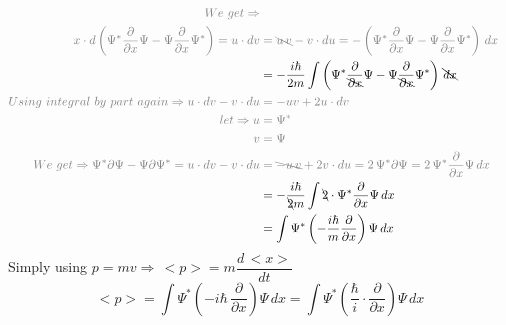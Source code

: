 \begin{align}
        \color{gray} We~get\Rightarrow\\
        \color{gray} x \cdot d \left( \Psi^*\dfrac{\partial}{\partial x}\Psi - \Psi \dfrac{\partial}{\partial x}\Psi^* \right)
        = u\cdot dv
        &\color{gray} = \bcancel{u\,v} - v\cdot du
        = - \left( \Psi^*\dfrac{\partial}{\partial x}\Psi - \Psi \dfrac{\partial}{\partial x}\Psi^* \right)\,dx\\
        & =  -\dfrac{i\hbar}{2m} \int \left( \Psi^*\dfrac{\partial}{\bcancel{\partial x}}\Psi - \Psi \dfrac{\partial}{\bcancel{\partial x}}\Psi^* \right) \,\bcancel{dx}\\
        \color{gray} Using~integral~by~part~again\Rightarrow u\cdot dv - v\cdot du
        &\color{gray} = - uv + 2u\cdot dv\\
        \color{gray} let\Rightarrow u 
        &\color{gray} = \Psi^*\\
        \color{gray} v
        &\color{gray} = \Psi\\
        \color{gray} We~get\Rightarrow
        \color{gray} \Psi^*\partial\Psi - \Psi \partial\Psi^*
        = u\cdot dv - v\cdot du
        &\color{gray} = \bcancel{-u\,v} + 2v\cdot du
        = 2\,\Psi^* \partial\Psi
        = 2\,\Psi^* \dfrac{\partial}{\partial x}\Psi\,dx\\
        & = -\dfrac{i\hbar}{\bcancel{2}m} \int \bcancel{2}\cdot \Psi^* \dfrac{\partial}{\partial x}\Psi\,dx\\
        & = \int \Psi^* \left(-\dfrac{i\hbar}{m}\dfrac{\partial}{\partial x}\right)\Psi\,dx
    \end{align}
    Simply using $p = mv \Rightarrow\, <p> = m\dfrac{d\,<x>}{dt}$
    \[
        <p> = \int \Psi^* \left(-i\hbar\,\dfrac{\partial}{\partial x}\right)\Psi\,dx = \int \Psi^* \left(\dfrac{\hbar}{i}\cdot\dfrac{\partial}{\partial x}\right)\Psi\,dx
    \]